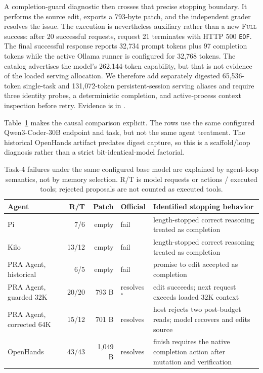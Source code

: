 \documentclass[11pt]{article}
\begin{document}
A completion-guard diagnostic then crosses that precise stopping boundary.  It
performs the source edit, exports a 793-byte patch, and the independent grader
resolves the issue.  The execution is nevertheless auxiliary rather than a new
\textsc{Full} success: after 20 successful requests, request 21 terminates with
HTTP 500 \texttt{EOF}.  The final successful response reports 32,734 prompt
tokens plus 97 completion tokens while the active Ollama runner is configured
for 32,768 tokens.  The catalog advertises the model's 262,144-token capability,
but that is not evidence of the loaded serving allocation.  We therefore add
separately digested 65,536-token single-task and 131,072-token persistent-session
serving aliases and require three identity probes, a deterministic completion,
and active-process context inspection before retry.  Evidence is in
.

Table~\ref{tab:same-model-task4-agent-loop} makes the causal comparison
explicit.  The rows use the same configured Qwen3-Coder-30B endpoint and task,
but not the same agent treatment.  The historical OpenHands artifact predates
digest capture, so this is a scaffold/loop diagnosis rather than a strict
bit-identical-model factorial.

\begin{table}[H]
\centering
\scriptsize
\caption{Task-4 failures under the same configured base model are explained by
agent-loop semantics, not by memory selection.  R/T is model requests or
actions / executed tools; rejected proposals are not counted as executed
tools.}
\label{tab:same-model-task4-agent-loop}
\begin{tabular}{lrrlp{4.8cm}}
\toprule
Agent & R/T & Patch & Official & Identified stopping behavior \\
\midrule
Pi & 7/6 & empty & fail & length-stopped correct reasoning treated as completion \\
Kilo & 13/12 & empty & fail & length-stopped correct reasoning treated as completion \\
PRA Agent, historical & 6/5 & empty & fail & promise to edit accepted as completion \\
PRA Agent, guarded 32K & 20/20 & 793 B & resolves$^{*}$ & edit succeeds; next request exceeds loaded 32K context \\
PRA Agent, corrected 64K & 15/12 & 701 B & resolves & host rejects two post-budget reads; model recovers and edits source \\
OpenHands & 43/43 & 1,049 B & resolves & finish requires the native completion action after mutation and verification \\
\bottomrule
\end{tabular}
\end{table}
\end{document}
